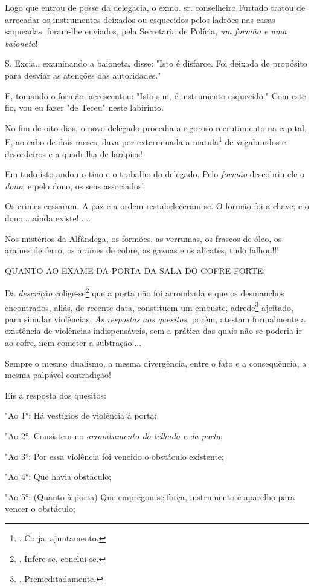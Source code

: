 Logo que entrou de posse da delegacia, o exmo. sr. conselheiro Furtado
tratou de arrecadar os instrumentos deixados ou esquecidos pelos ladrões
nas casas saqueadas: foram-lhe enviados, pela Secretaria de Polícia,
\emph{um formão e uma baioneta}!

S. Excia., examinando a baioneta, disse: "Isto é disfarce. Foi deixada
de propósito para desviar as atenções das autoridades."

E, tomando o formão, acrescentou: "Isto sim, é instrumento esquecido."
Com este fio, vou eu fazer "de Teceu" neste labirinto.

No fim de oito dias, o novo delegado procedia a rigoroso recrutamento na
capital. E, ao cabo de dois meses, dava por exterminada a
matula\footnote{. Corja, ajuntamento.} de vagabundos e desordeiros e a
quadrilha de larápios!

Em tudo isto andou o tino e o trabalho do delegado. Pelo \emph{formão}
descobriu ele o \emph{dono}; e pelo dono, os seus associados!

Os crimes cessaram. A paz e a ordem restabeleceram-se. O formão foi a
chave; e o dono... ainda existe!.....

Nos mistérios da Alfândega, os formões, as verrumas, os frascos de óleo,
os arames de ferro, os arames de cobre, as gazuas e os alicates, tudo
falhou!!!

QUANTO AO EXAME DA PORTA DA SALA DO COFRE-FORTE:

Da \emph{descrição} colige-se\footnote{. Infere-se, conclui-se.} que a
porta não foi arrombada e que os desmanchos encontrados, aliás, de
recente data, constituem um embuste, adrede\footnote{. Premeditadamente.}
ajeitado, para simular violências. \emph{As respostas} \emph{aos
quesitos}, porém, atestam formalmente a existência de violências
indispensáveis, sem a prática das quais não se poderia ir ao cofre, nem
cometer a subtração!...

Sempre o mesmo dualismo, a mesma divergência, entre o fato e a
consequência, a mesma palpável contradição!

Eis a resposta dos quesitos:

"Ao 1°: Há vestígios de violência à porta;

"Ao 2°: Consistem no \emph{arrombamento do telhado e da porta};

"Ao 3°: Por essa violência foi vencido o obstáculo existente;

"Ao 4°: Que havia obstáculo;

"Ao 5°: (Quanto à porta) Que empregou-se força, instrumento e aparelho
para vencer o obstáculo;

